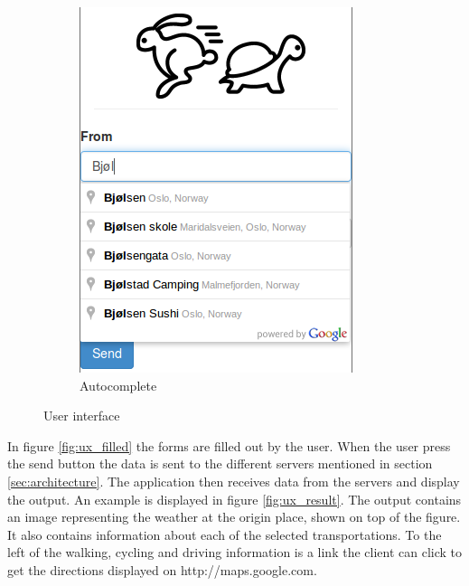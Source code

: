 \documentclass[10pt,a4paper]{article}
\begin{document}
\begin{figure}[h]
\begin{subfigure}{0.4\textwidth}
    \includegraphics[width=\textwidth]{../ux/autocomplete}
    \caption{Autocomplete}
\label{fig:ux_autocomplete}
  \end{subfigure}
  \caption{User interface}
  \label{fig:ux_first}
\end{figure}
In figure \ref{fig:ux_filled} the forms are filled out by the user. When the user press the send button the data is sent to the different servers mentioned in section \ref{sec:architecture}. The application then receives data from the servers and display the output. An example is displayed in figure \ref{fig:ux_result}. The output contains an image representing the weather at the origin place, shown on top of the figure. It also contains information about each of the selected transportations. To the left of the walking, cycling and driving information is a link the client can click to get the directions displayed on http://maps.google.com.
\end{document}
